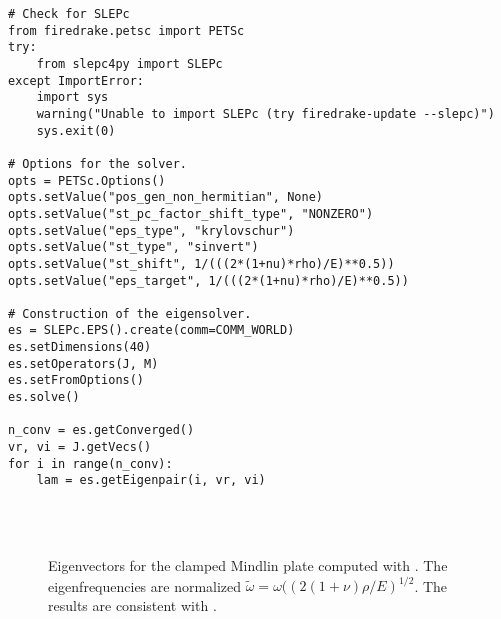 \begin{tcolorbox}[title = Eigenvalues computation in  \firedrake, coltitle=black, breakable, size=fbox, boxrule=1pt, pad at break*=1mm, colframe=cyan, enlarge top by=0.25em, enlarge bottom by=0.5em]
\begin{Verbatim}[tabsize=4]
# Check for SLEPc
from firedrake.petsc import PETSc
try:
	from slepc4py import SLEPc
except ImportError:
	import sys
	warning("Unable to import SLEPc (try firedrake-update --slepc)")
	sys.exit(0)
	
# Options for the solver.
opts = PETSc.Options()
opts.setValue("pos_gen_non_hermitian", None)
opts.setValue("st_pc_factor_shift_type", "NONZERO")
opts.setValue("eps_type", "krylovschur")
opts.setValue("st_type", "sinvert")
opts.setValue("st_shift", 1/(((2*(1+nu)*rho)/E)**0.5))
opts.setValue("eps_target", 1/(((2*(1+nu)*rho)/E)**0.5))

# Construction of the eigensolver.
es = SLEPc.EPS().create(comm=COMM_WORLD)
es.setDimensions(40)
es.setOperators(J, M)
es.setFromOptions()
es.solve()

n_conv = es.getConverged()
vr, vi = J.getVecs()
for i in range(n_conv):
	lam = es.getEigenpair(i, vr, vi)
\end{Verbatim}
\end{tcolorbox}


\begin{figure*}[hp]
	\centering
	\hfil
	 \\
	\hfil
	 \\
	\hfil
	\caption{Eigenvectors for the clamped Mindlin plate computed with \firedrake. The eigenfrequencies are normalized $\widetilde{\omega} = \omega((2(1+\nu)\rho/E)^{1/2}$. The results are consistent with \cite{dawe1980rayleigh}.}
	\label{fig:EigMin}
\end{figure*}



